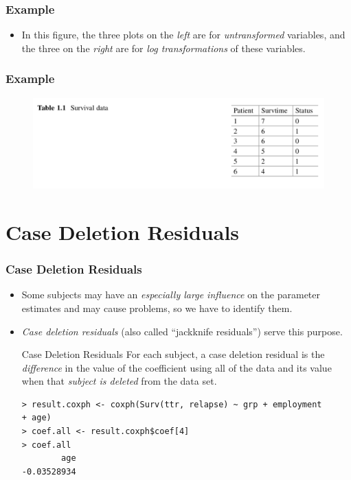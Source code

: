 \documentclass{beamer}
\newcommand{\empr}[1]{{\emph{\color{red}#1}}}
\begin{document}
\pagebreak
\begin{frame}[fragile]
\frametitle{Example}
\begin{itemize}
\begin{Verbatim}
> logPriorAttemptsT <- log(priorAttemptsT + 1)
> plot(rr.0 ~ logPriorAttemptsT)
> smoothSEcurve(rr.0, logPriorAttemptsT)
> title("Martingale residuals versus log prior attempts")

> plot(rr.0 ~ longestNoSmoke)
> smoothSEcurve(rr.0, longestNoSmoke) 
> title("Martingale residuals versus longest period without smoking")
	
> logLongestNoSmoke <- log(longestNoSmoke+1) 
> plot(rr.0 ~ logLongestNoSmoke)
> smoothSEcurve(rr.0, logLongestNoSmoke)
> title("Martingale residuals versus log of longest period without smoking")
\end{Verbatim}
\item In this figure, the three plots on the \empr{left} are for \empr{untransformed} variables, and the three on the \empr{right} are for \empr{log transformations} of these variables.
\end{itemize}
\end{frame}

\pagebreak
\begin{frame}
\frametitle{Example}
\begin{figure}
\includegraphics[scale = .35]{001.png}
\end{figure}
\end{frame}

\section{Case Deletion Residuals}
\begin{frame}[fragile]
\frametitle{Case Deletion Residuals}
\begin{itemize}
\item Some subjects may have an \empr{especially large influence} on the parameter estimates and may cause problems, so we have to identify them.
\item \empr{Case deletion residuals} (also called ``jackknife residuals'') serve this purpose.
\begin{defblock}{Case Deletion Residuals}
For each subject, a case deletion residual is the \empr{difference} in the value of the coefficient using all of the data and its value when that \empr{subject is deleted} from the data set.
\end{defblock}
\begin{Verbatim}
> result.coxph <- coxph(Surv(ttr, relapse) ~ grp + employment 
+ age)
> coef.all <- result.coxph$coef[4]
> coef.all
        age
-0.03528934
\end{Verbatim}
\end{itemize}
\end{frame}
\end{document}
